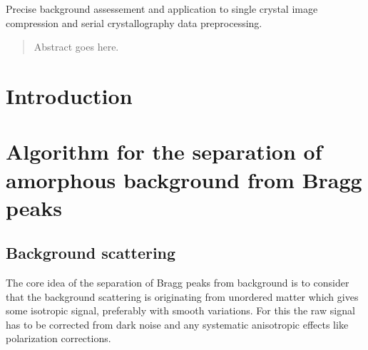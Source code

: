 \documentclass[preprint]{iucr}              %
\begin{document}
\maketitle                        %

\begin{synopsis}
Precise background assessement and application to single crystal image compression and serial crystallography data preprocessing. 
\end{synopsis}

\begin{abstract}
Abstract goes here.
\end{abstract}



\section{Introduction}


\section{Algorithm for the separation of amorphous background from Bragg peaks}
\subsection{Background scattering}
The core idea of the separation of Bragg peaks from background is to consider that the background scattering 
is originating from unordered matter which gives some isotropic signal, preferably with smooth variations.
For this the raw signal has to be corrected from dark noise and any systematic anisotropic effects like polarization corrections.
\end{document}
